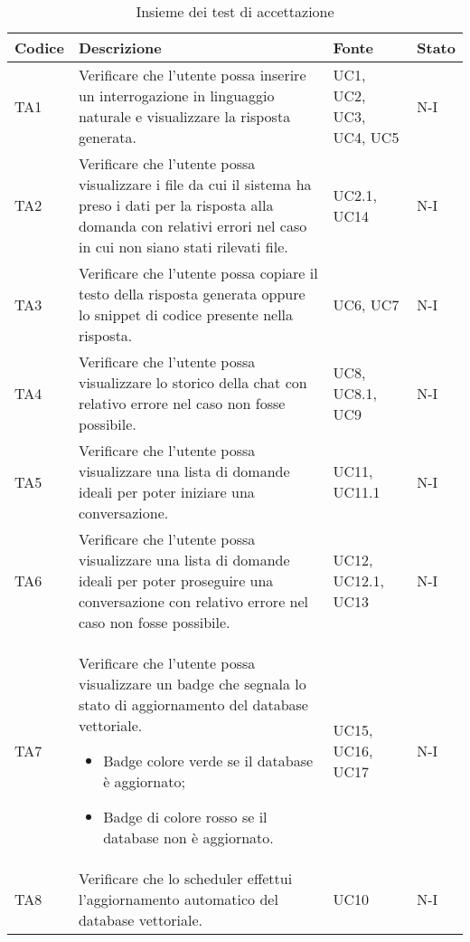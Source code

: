 \begin{table}[h!]
    \centering
    \renewcommand{\arraystretch}{1.5} %
    \begin{tabularx}{\textwidth}{|p{}|X|p{}|p{}|}\hline
    \rowcolor[HTML]{FFD700}
    \textbf{Codice} & \textbf{Descrizione} & \textbf{Fonte} & \textbf{Stato} \\ \hline
    TA1 & Verificare che l'utente possa inserire un interrogazione in linguaggio naturale e visualizzare la risposta generata. & UC1, UC2, UC3, UC4, UC5 & N-I \\ \hline
    TA2 & Verificare che l'utente possa visualizzare i file da cui il sistema ha preso i dati per la risposta alla domanda con relativi errori nel caso in cui non siano stati rilevati file.  & UC2.1, UC14 & N-I \\ \hline
    TA3 & Verificare che l'utente possa copiare il testo della risposta generata oppure lo snippet di codice presente nella risposta. & UC6, UC7 & N-I \\ \hline
    TA4 & Verificare che l'utente possa visualizzare lo storico della chat con relativo errore nel caso non fosse possibile.  & UC8, UC8.1, UC9 & N-I \\ \hline
    TA5 & Verificare che l'utente possa visualizzare una lista di domande ideali per poter iniziare una conversazione. & UC11, UC11.1 & N-I \\ \hline
    TA6 & Verificare che l'utente possa visualizzare una lista di domande ideali per poter proseguire una conversazione con relativo errore nel caso non fosse possibile. & UC12, UC12.1, UC13 & N-I \\ \hline
    TA7 & Verificare che l'utente possa visualizzare un badge che segnala lo stato di aggiornamento del database vettoriale.
    \begin{itemize}
        \item Badge colore verde se il database è aggiornato;
        \item Badge di colore rosso se il database non è aggiornato.
    \end{itemize} 
        & UC15, UC16, UC17 & N-I \\ \hline
    TA8 & Verificare che lo scheduler effettui l'aggiornamento automatico del database vettoriale. & UC10 & N-I \\ \hline

    \end{tabularx}
    \caption{Insieme dei test di accettazione}
\end{table}



